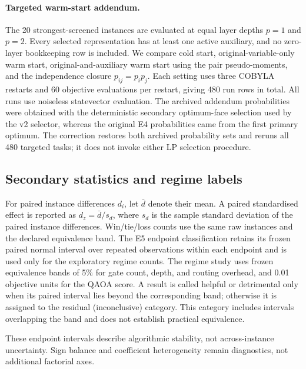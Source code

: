 \documentclass[a4paper,onecolumn,11pt,unpublished]{quantumarticle}
\theoremstyle{remark}
\begin{document}
\paragraph{Targeted warm-start addendum.}
The 20 strongest-screened instances are evaluated at equal layer depths
$p=1$ and $p=2$.  Every selected representation has at least one active
auxiliary, and no zero-layer bookkeeping row is included.  We compare cold
start, original-variable-only warm start, original-and-auxiliary warm start
using the pair pseudo-moments, and the independence closure
$p_{ij}=p_i p_j$.  Each setting uses three COBYLA restarts and 60 objective
evaluations per restart, giving 480 run rows in total.  All runs use noiseless
statevector evaluation. The archived addendum probabilities were obtained
with the deterministic secondary optimum-face selection used by the v2
selector, whereas the original E4 probabilities came from the first primary
optimum. The correction restores both archived probability sets and reruns
all 480 targeted tasks; it does not invoke either LP selection procedure.

\subsection{Secondary statistics and regime labels}
\label{app:experimental-statistics}

For paired instance differences $d_i$, let $\bar d$ denote their mean.
A paired standardised effect is reported as
$d_z=\bar d/s_d$, where $s_d$ is the sample standard deviation of the paired
instance differences.  Win/tie/loss counts use the same raw instances and the
declared equivalence band.  The E5 endpoint classification retains its frozen
paired normal interval over repeated observations within each endpoint and is used only for the
exploratory regime counts.  The regime study uses frozen
equivalence bands of 5\% for gate count, depth, and routing overhead, and 0.01
objective units for the QAOA score.  A result is called helpful or detrimental
only when its paired interval lies beyond the corresponding band; otherwise it
is assigned to the residual (inconclusive) category. This category includes
intervals overlapping the band and does not establish practical equivalence.

These endpoint intervals describe algorithmic stability, not across-instance
uncertainty. Sign balance and coefficient heterogeneity remain diagnostics,
not additional factorial axes.

\FloatBarrier
\end{document}
